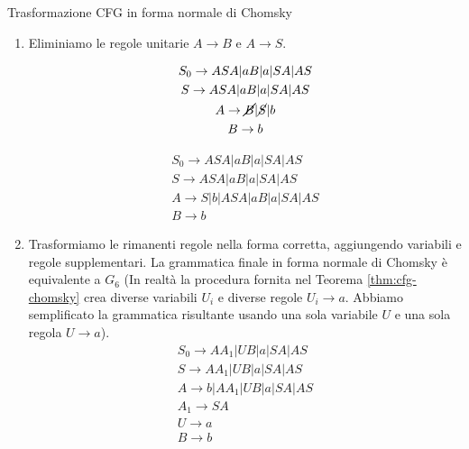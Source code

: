 \begin{Example}{Trasformazione CFG in forma normale di Chomsky}{}
\begin{enumerate}
    \begin{minipage}{0.49\textwidth}
    \begin{gather*}
        S_0\to S\\
        S\to ASA|aB|a|SA|AS|\cancel{S}\\
        a\to B|S\\
        B\to b
    \end{gather*}
    \end{minipage}
    \begin{minipage}{0.49\textwidth}
    \begin{gather*}
        S_0\to \cancel{S}|ASA|aB|a|SA|AS\\
        S\to ASA|aB|a|SA|AS\\
        A\to B|S\\
        B\to b
    \end{gather*}    
    \end{minipage}
    \item[3b.] Eliminiamo le regole unitarie $A\to B$ e $A\to S$.

    \begin{minipage}{0.49\textwidth}
    \begin{gather*}
        S_0\to ASA|aB|a|SA|AS\\
        S\to ASA|aB|a|SA|AS\\
        A\to \cancel{B}|\cancel{S}|b\\
        B\to b
    \end{gather*}
    \end{minipage}
    \begin{minipage}{0.49\textwidth}
    \begin{gather*}
        S_0\to ASA|aB|a|SA|AS\\
        S\to ASA|aB|a|SA|AS\\
        A\to S|b|ASA|aB|a|SA|AS\\
        B\to b
    \end{gather*}    
    \end{minipage}
    \item[4.] Trasformiamo le rimanenti regole nella forma corretta, aggiungendo variabili e regole supplementari. La grammatica finale in forma normale di Chomsky è equivalente a $G_{6}$ (In realtà la procedura fornita nel Teorema \ref{thm:cfg-chomsky} crea diverse variabili $U_i$ e diverse regole $U_i\to a$. Abbiamo semplificato la grammatica risultante usando una sola variabile $U$ e una sola regola $U\to a$).
    \begin{gather*}
        S_0\to AA_1|UB|a|SA|AS\\
        S\to AA_1|UB|a|SA|AS\\
        A\to b|AA_1|UB|a|SA|AS\\
        A_1\to SA\\
        U\to a\\
        B\to b
    \end{gather*}
\end{enumerate}    
\end{Example}

